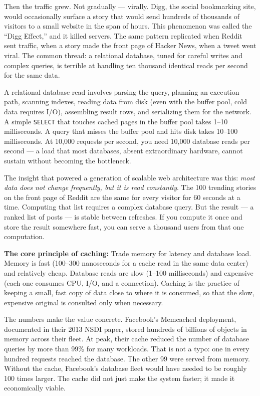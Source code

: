 \documentclass[11pt,a4paper]{article}
\begin{document}
Then the traffic grew. Not gradually --- virally. Digg, the social bookmarking site, would occasionally surface a story that would send hundreds of thousands of visitors to a small website in the span of hours. This phenomenon was called the ``Digg Effect,'' and it killed servers. The same pattern replicated when Reddit sent traffic, when a story made the front page of Hacker News, when a tweet went viral. The common thread: a relational database, tuned for careful writes and complex queries, is terrible at handling ten thousand identical reads per second for the same data.

A relational database read involves parsing the query, planning an execution path, scanning indexes, reading data from disk (even with the buffer pool, cold data requires I/O), assembling result rows, and serializing them for the network. A simple \texttt{SELECT} that touches cached pages in the buffer pool takes 1--10 milliseconds. A query that misses the buffer pool and hits disk takes 10--100 milliseconds. At 10,000 requests per second, you need 10,000 database reads per second --- a load that most databases, absent extraordinary hardware, cannot sustain without becoming the bottleneck.

The insight that powered a generation of scalable web architecture was this: \emph{most data does not change frequently, but it is read constantly}. The 100 trending stories on the front page of Reddit are the same for every visitor for 60 seconds at a time. Computing that list requires a complex database query. But the result --- a ranked list of posts --- is stable between refreshes. If you compute it once and store the result somewhere fast, you can serve a thousand users from that one computation.

\begin{insightbox}
\textbf{The core principle of caching:} Trade memory for latency and database load. Memory is fast (100--300 nanoseconds for a cache read in the same data center) and relatively cheap. Database reads are slow (1--100 milliseconds) and expensive (each one consumes CPU, I/O, and a connection). Caching is the practice of keeping a small, fast copy of data close to where it is consumed, so that the slow, expensive original is consulted only when necessary.
\end{insightbox}

The numbers make the value concrete. Facebook's Memcached deployment, documented in their 2013 NSDI paper, stored hundreds of billions of objects in memory across their fleet. At peak, their cache reduced the number of database queries by more than 99\% for many workloads. That is not a typo: one in every hundred requests reached the database. The other 99 were served from memory. Without the cache, Facebook's database fleet would have needed to be roughly 100 times larger. The cache did not just make the system faster; it made it economically viable.
\end{document}
